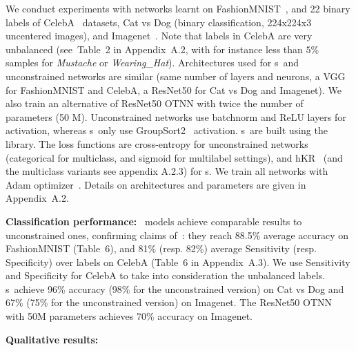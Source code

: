 We conduct experiments with networks learnt on FashionMNIST~\cite{Xiao2017FashionMNIST}, and 22 binary labels of CelebA~\cite{liu2015faceattributes} datasets, Cat vs Dog (binary classification, 224x224x3 uncentered images),  and Imagenet~\cite{imagenet}. Note that labels in CelebA are very unbalanced (see~Table~2 in Appendix~A.2, with for instance less than $5\%$ samples for \textit{Mustache} or \textit{Wearing\_Hat}).%
Architectures used for \otnn s~and unconstrained networks are similar (same number of layers and neurons, a VGG for FashionMNIST and CelebA, a ResNet50 for Cat vs Dog and Imagenet). We also train an alternative of ResNet50 OTNN with twice the number of parameters (50 M).  Unconstrained networks use batchnorm and ReLU layers for activation, whereas \otnn s~only use GroupSort2~\cite{pmlr-v97-anil19a,serrurier2021achieving} activation. \otnn s~are built using the \Deellip library.  
The loss functions are cross-entropy for unconstrained networks (categorical for multiclass, and sigmoid for multilabel settings), and hKR \losshkr~(and the multiclass variants see appendix A.2.3) for \otnn s. We train all networks with Adam optimizer~\cite{Diederik14Adam}. Details on architectures and parameters are given in Appendix~A.2.


\textbf{Classification performance:} \otnn~models achieve comparable results to  unconstrained ones, confirming claims of~\cite{bethunelip}: they reach 88.5\%
average accuracy on FashionMNIST
(Table~6), and 81\% (resp. 82\%) average Sensitivity (resp. Specificity) over labels on CelebA (Table~6 in Appendix~A.3). We use  Sensitivity and Specificity for CelebA to take into consideration the unbalanced labels. \otnn s~achieve 96\%  accuracy (98\% for the unconstrained version) on Cat vs Dog and 67\% (75\% for the unconstrained version) on Imagenet. The ResNet50 OTNN with 50M parameters achieves 70\% accuracy on Imagenet. 




\textbf{Qualitative results: }
